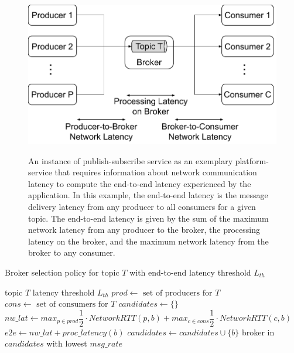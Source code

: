 \begin{figure}
\centering
\includegraphics[width=0.6\linewidth]{figures/mechanisms/nw_proximity/pubsub_e2e_latency.pdf}
\label{fig:nw_proximity_pubsub_e2e_latency}
\caption{An instance of publish-subscribe service as an exemplary platform-service that requires information about network communication latency to compute the end-to-end latency experienced by the application. In this example, the end-to-end latency is the message delivery latency from any producer to all consumers for a given topic. The end-to-end latency is given by the sum of the maximum network latency from any producer to the broker, the processing latency on the broker, and the maximum network latency from the broker to any consumer.}
\end{figure}

\begin{algorithm}
\caption{Broker selection policy for topic $T$ with end-to-end latency threshold $L_{th}$}
\label{algo:pubsub_nw_prox_example}
\begin{algorithmic}
\Require topic $T$
\Require latency threshold $L_{th}$
\State $prod \gets \text{ set of producers for }T$
\State $cons \gets \text{ set of consumers for }T$
\State $candidates \gets \{\}$
    \State $nw\_lat \gets max_{p \in prod} \dfrac{1}{2} \cdot NetworkRTT \left( p, b \right) + max_{c \in cons} \dfrac{1}{2} \cdot NetworkRTT \left( c, b \right)$
    \State $e2e \gets nw\_lat + proc\_latency \left( b \right)$
        \State $candidates \gets candidates \cup \{b\}$
    \EndIf
\EndFor
\Return broker in $candidates$ with lowest $msg\_rate$
\end{algorithmic}
\end{algorithm}

